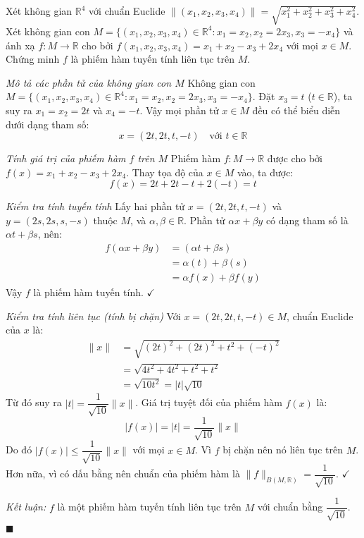 \begin{questionbox}
Xét không gian $\mathbb{R}^4$ với chuẩn Euclide $\|(x_1, x_2, x_3, x_4)\| = \sqrt{x_1^2 + x_2^2 + x_3^2 + x_4^2}$. Xét không gian con $M = \{(x_1, x_2, x_3, x_4) \in \mathbb{R}^4 : x_1 = x_2, x_2 = 2x_3, x_3 = -x_4\}$ và ánh xạ $f : M \to \mathbb{R}$ cho bởi $f(x_1, x_2, x_3, x_4) = x_1 + x_2 - x_3 + 2x_4$ với mọi $x \in M$. Chứng minh $f$ là phiếm hàm tuyến tính liên tục trên $M$.
\end{questionbox}

\begin{solution}
\textit{Mô tả các phần tử của không gian con $M$}
Không gian con $M = \{(x_1, x_2, x_3, x_4) \in \mathbb{R}^4 : x_1 = x_2, x_2 = 2x_3, x_3 = -x_4\}$.
Đặt $x_3 = t$ ($t \in \mathbb{R}$), ta suy ra $x_1 = x_2 = 2t$ và $x_4 = -t$.
Vậy mọi phần tử $x \in M$ đều có thể biểu diễn dưới dạng tham số:
\[
    x = (2t, 2t, t, -t) \quad \text{với } t \in \mathbb{R}
\]

\textit{Tính giá trị của phiếm hàm $f$ trên $M$}
Phiếm hàm $f: M \to \mathbb{R}$ được cho bởi $f(x) = x_1 + x_2 - x_3 + 2x_4$.
Thay tọa độ của $x \in M$ vào, ta được:
\[
    f(x) = 2t + 2t - t + 2(-t) = t
\]

\textit{Kiểm tra tính tuyến tính}
Lấy hai phần tử $x = (2t, 2t, t, -t)$ và $y = (2s, 2s, s, -s)$ thuộc $M$, và $\alpha, \beta \in \mathbb{R}$.
Phần tử $\alpha x + \beta y$ có dạng tham số là $\alpha t + \beta s$, nên:
\begin{align*}
    f(\alpha x + \beta y) &= (\alpha t + \beta s) \\
    &= \alpha(t) + \beta(s) \\
    &= \alpha f(x) + \beta f(y)
\end{align*}
Vậy $f$ là phiếm hàm tuyến tính. $\checkmark$

\textit{Kiểm tra tính liên tục (tính bị chặn)}
Với $x = (2t, 2t, t, -t) \in M$, chuẩn Euclide của $x$ là:
\begin{align*}
    \|x\| &= \sqrt{(2t)^2 + (2t)^2 + t^2 + (-t)^2} \\
    &= \sqrt{4t^2 + 4t^2 + t^2 + t^2} \\
    &= \sqrt{10t^2} = |t|\sqrt{10}
\end{align*}
Từ đó suy ra $|t| = \dfrac{1}{\sqrt{10}}\|x\|$.
Giá trị tuyệt đối của phiếm hàm $f(x)$ là:
\[
    |f(x)| = |t| = \dfrac{1}{\sqrt{10}} \|x\|
\]
Do đó $|f(x)| \leq \dfrac{1}{\sqrt{10}} \|x\|$ với mọi $x \in M$. 
Vì $f$ bị chặn nên nó liên tục trên $M$. Hơn nữa, vì có dấu bằng nên chuẩn của phiếm hàm là $\|f\|_{B(M, \mathbb{R})} = \dfrac{1}{\sqrt{10}}$. $\checkmark$

\textit{Kết luận:} $f$ là một phiếm hàm tuyến tính liên tục trên $M$ với chuẩn bằng $\dfrac{1}{\sqrt{10}}$. $\blacksquare$
\end{solution}

